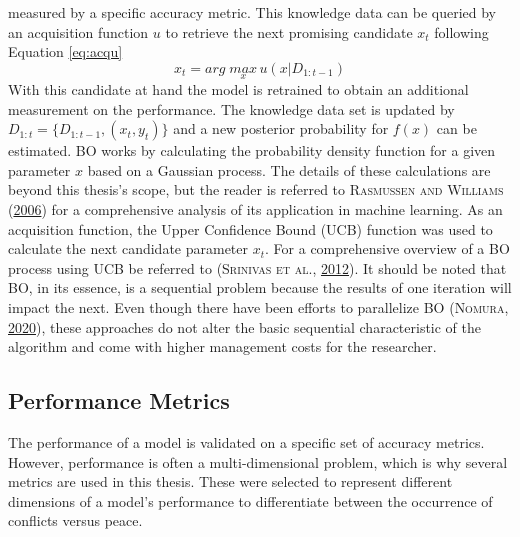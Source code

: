 \documentclass[a4paper,11pt]{article}
\begin{document}
measured by a specific accuracy metric. This knowledge data can be queried by an
acquisition function \(u\) to retrieve the next promising candidate \(x_t\) following
Equation \eqref{eq:acqu}
\begin{equation}
x_{t} = arg \;\underset{x}{max} \, u(x|D_{1:t-1})
\label{eq:acqu}
\end{equation}
With this candidate at hand the model is retrained to obtain an additional
measurement on the performance. The knowledge data set is updated by
\(D_{1:t} = \{D_{1:t-1},(x_t,y_t)\}\) and a new posterior probability for \(f(x)\)
can be estimated.
BO works by calculating the probability density function for a given parameter
\(x\) based on a Gaussian process. The details of these calculations are beyond
this thesis's scope, but the reader is referred to \textsc{\textnormal{Rasmussen} and \textnormal{Williams}} \textsc{(\textnormal{\protect\hyperlink{ref-rasmussen2006}{2006}})} for a
comprehensive analysis of its application in machine learning. As an acquisition
function, the Upper Confidence Bound (UCB) function was used to calculate the next
candidate parameter \(x_t\). For a comprehensive overview of a BO process using
UCB be referred to \textsc{(\textnormal{\textsc{Srinivas} \textsc{et al.}}, \textnormal{\protect\hyperlink{ref-srinivas2012}{2012}})}. It should be noted that BO, in its essence, is
a sequential problem because the results of one iteration will impact the next.
Even though there have been efforts to parallelize BO \textsc{(\textnormal{\textsc{Nomura}}, \textnormal{\protect\hyperlink{ref-nomura2020}{2020}})}, these
approaches do not alter the basic sequential characteristic of the algorithm and
come with higher management costs for the researcher.

\hypertarget{performance-metrics}{%
\subsection{Performance Metrics}\label{performance-metrics}}

\setcounter{page}{41}

The performance of a model is validated on a specific set of accuracy
metrics. However, performance is often a multi-dimensional problem, which is why
several metrics are used in this thesis. These were selected to
represent different dimensions of a model's performance to differentiate between
the occurrence of conflicts versus peace.
\end{document}
